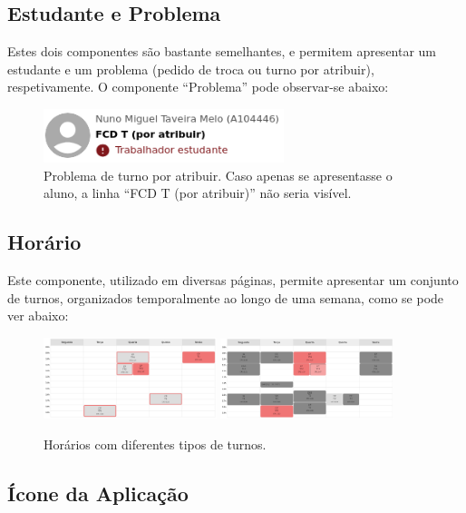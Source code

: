 \documentclass[12pt, a4paper]{article}
\begin{document}
\subsection{Estudante e Problema}

Estes dois componentes são bastante semelhantes, e permitem apresentar um estudante e um problema
(pedido de troca ou turno por atribuir), respetivamente. O componente ``Problema'' pode observar-se
abaixo:

\begin{figure}[H]
    \centering
    \includegraphics[width=7cm]{res/components/problem.png}
    \caption{
        \onehalfspacing
        Problema de turno por atribuir. Caso apenas se apresentasse o aluno, a linha
        ``FCD T (por atribuir)'' não seria visível.
    }
    \label{problem}
\end{figure}

\subsection{Horário}

Este componente, utilizado em diversas páginas, permite apresentar um conjunto de turnos,
organizados temporalmente ao longo de uma semana, como se pode ver abaixo:

\begin{figure}[H]
    \centering
    \includegraphics[width=0.45\textwidth]{res/components/schedule-1.png}
    \includegraphics[width=0.45\textwidth]{res/components/schedule-2.png}
    \caption{Horários com diferentes tipos de turnos.}
    \label{schedule}
\end{figure}

\subsection{Ícone da Aplicação}
\end{document}
